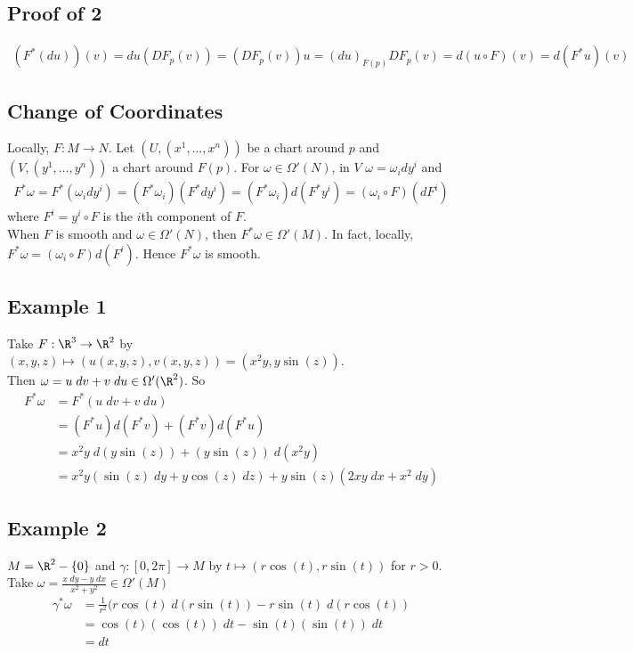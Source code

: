 \documentclass[11pt]{article}
\begin{document}
\subsection*{Proof of 2}
\label{sec:org8e832b4}
\begin{align*}
  (F^{*}(du))(v)
  =du(DF_{p}(v))
  =(DF_{p}(v))u
  =(du)_{F(p)}DF_{p}(v)
  =d(u\circ F)(v)
  =d(F^{*}u)(v)
\end{align*}
\subsection*{Change of Coordinates}
\label{sec:org7c546b4}
Locally, \(F:M\to N\). Let \((U,(x^{1},\ldots,x^{n}))\) be a chart around \(p\) and \((V,(y^{1},\ldots,y^{n}))\) a chart around \(F(p)\). For \(\omega\in\Omega'(N)\), in \(V\) \(\omega=\omega_{i}dy^{i}\) and\\
\begin{align*}
  F^{*}\omega
  =F^{*}(\omega_{i}dy^{i})
  =(F^{*}\omega_{i})(F^{*}dy^{i})
  =(F^{*}\omega_{i})d(F^{*}y^{i})
  =(\omega_{i}\circ F)(dF^{i})
\end{align*}
where \(F^{i}=y^{i}\circ F\) is the \(i\)th component of \(F\).\\
When \(F\) is smooth and \(\omega\in\Omega'(N)\), then \(F^{*}\omega\in\Omega'(M)\). In fact, locally, \(F^{*}\omega=(\omega_{i}\circ F)d(F^{i})\). Hence \(F^{*}\omega\) is smooth.\\
\subsection*{Example 1}
\label{sec:org5a8aff8}
Take \(F:\R^{3}\to\R^{2}\) by \((x,y,z)\mapsto(u(x,y,z),v(x,y,z))=(x^{2}y,y\sin(z))\).\\
Then \(\omega=u\;dv+v\;du\in\Omega'(\R^{2})\). So\\
\begin{align*}
  F^{*}\omega
  &=F^{*}(u\;dv+v\;du) \\
  &=(F^{*}u)d(F^{*}v)+(F^{*}v)d(F^{*}u) \\
  &=x^{2}y\;d(y\sin(z))+(y\sin(z))\;d(x^{2}y) \\
  &=x^{2}y(\sin(z)\;dy+y\cos(z)\;dz)+y\sin(z)(2xy\;dx+x^{2}\;dy)
\end{align*}
\subsection*{Example 2}
\label{sec:org39ee152}
\(M=\R^{2}-\{0\}\) and \(\gamma:[0,2\pi]\to M\) by \(t\mapsto(r\cos(t),r\sin(t))\) for \(r>0\). Take \(\omega=\frac{x\;dy-y\;dx}{x^{2}+y^{2}}\in\Omega'(M)\)\\
\begin{align*}
  \gamma^{*}\omega
  &=\frac{1}{r^{2}}(r\cos(t)\;d(r\sin(t))-r\sin(t)\;d(r\cos(t)) \\
  &=\cos(t)(\cos(t))\;dt-\sin(t)(\sin(t))\;dt \\
  &=dt
\end{align*}
\end{document}
